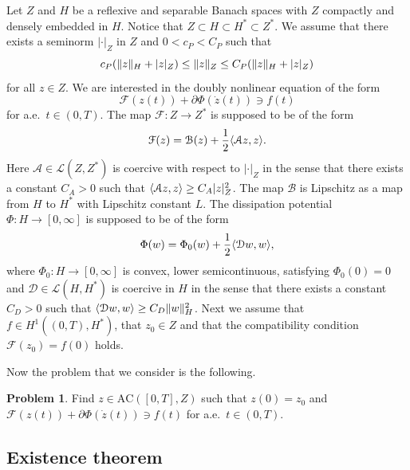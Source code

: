 \documentclass[a4paper,10pt,oneside]{amsbook}
\numberwithin{section}{chapter}
\numberwithin{equation}{chapter}
\theoremstyle{definition}
\newtheorem{prb}[prop]{Problem}
\DeclarePairedDelimiter{\norm}{\lVert}{\rVert}
\DeclarePairedDelimiter{\dual}{\langle}{\rangle}
\begin{document}
Let $Z$ and $H$ be a reflexive and separable Banach spaces with $Z$ compactly and densely embedded in $H$. Notice that $Z\subset H\subset H^*\subset Z^*$. We assume that there exists a seminorm $|\cdot|_Z$ in $Z$ and $0<c_P<C_P$ such that
\[
c_P(\norm{z}_H+|z|_Z)\le\norm{z}_Z\le C_P(\norm{z}_H+|z|_Z)
\]
for all $z\in Z$. We are interested in the doubly nonlinear equation of the form
\[
\mathcal{F}(z(t))+\partial\Phi(\dot z(t))\ni f(t)
\]
for a.e.\ $t\in(0,T)$. The map $\mathcal{F}\colon Z\to Z^*$ is supposed to be of the form
\[
\mathcal{F}(z)=\mathcal{B}(z)+\frac{1}{2}\dual{\mathcal{A}z,z}.
\]
Here $\mathcal{A}\in\mathscr{L}(Z,Z^*)$ is coercive with respect to $|\cdot|_Z$ in the sense that there exists a constant $C_A>0$ such that $\dual{\mathcal{A}z,z}\ge C_A|z|_Z^2$. The map $\mathcal{B}$ is Lipschitz as a map from $H$ to $H^*$ with Lipschitz constant $L$. The dissipation potential $\Phi\colon H\to[0,\infty]$ is supposed to be of the form
\[
\Phi(w)=\Phi_0(w)+\frac{1}{2}\dual{\mathcal{D}w,w},
\]
where $\Phi_0\colon H\to[0,\infty]$ is convex, lower semicontinuous, satisfying $\Phi_0(0)=0$ and $\mathcal{D}\in\mathscr{L}(H,H^*)$ is coercive in $H$ in the sense that there exists a constant $C_D>0$ such that $\dual{\mathcal{D}w,w}\ge C_D\norm{w}_H^2$. Next we assume that $f\in H^1((0,T),H^*)$, that $z_0\in Z$ and that the compatibility condition $\mathcal{F}(z_0)=f(0)$ holds.

Now the problem that we consider is the following.
\begin{prb}
\label{prb:roubickeck}
Find $z\in\text{AC}([0,T],Z)$ such that $z(0)=z_0$ and $\mathcal{F}(z(t))+\partial\Phi(\dot z(t))\ni f(t)$ for a.e.\ $t\in(0,T)$.
\end{prb}

\subsection{Existence theorem}
\end{document}
